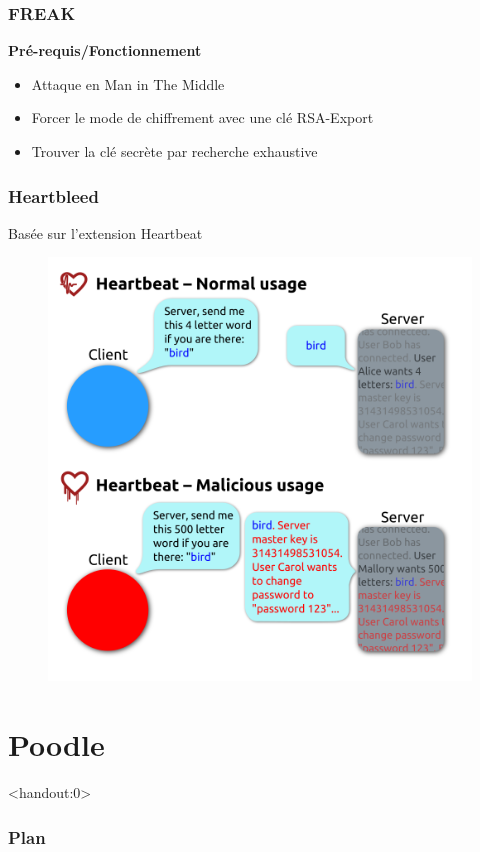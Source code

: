 \begin{frame}
  \frametitle{FREAK}
  \textbf{Pré-requis/Fonctionnement}
  \begin{itemize}
  \item Attaque en Man in The Middle
  \item Forcer le mode de chiffrement avec une clé RSA-Export
  \item Trouver la clé secrète par recherche exhaustive
  \end{itemize}
\end{frame}

\begin{frame}
  \frametitle{Heartbleed}
 Basée sur l'extension Heartbeat
  \begin{figure}[h]
    \centering
  \includegraphics[scale=0.17]{Heartbleed}
  \end{figure}
\end{frame}


\section{Poodle}

\begin{frame}<handout:0>
  \frametitle{Plan}
  \tableofcontents[currentsection]
\end{frame}

